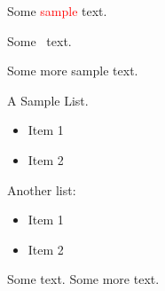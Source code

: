 \documentclass{article}
\providecommand{\TeXParserLibToImage}[2][]{#2}
\begin{document}
Some \textcolor{red}{sample} text.

\TeXParserLibToImage[type={image/png}]{Some \sample\ text.}

Some more sample text.

\TeXParserLibToImage[type={image/png}]{A Sample List.
\begin{itemize}
 \item Item 1
 \item Item 2
\end{itemize}}

Another list:
\begin{itemize}
 \item Item 1
 \item Item 2
\end{itemize}

\lipsum[1]

Some text.  Some more text.

\par\noindent
{}
\end{document}
